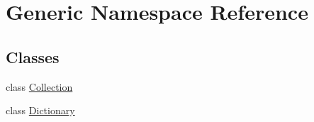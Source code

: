 \hypertarget{namespaceGeneric}{}\section{Generic Namespace Reference}
\label{namespaceGeneric}
\subsection*{Classes}
\begin{DoxyCompactItemize}
\item 
class \mbox{\hyperlink{classGeneric_1_1Collection}{Collection}}
\item 
class \mbox{\hyperlink{classGeneric_1_1Dictionary}{Dictionary}}
\end{DoxyCompactItemize}
